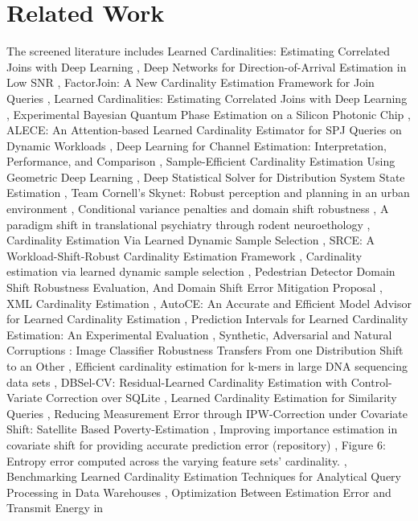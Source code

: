 \documentclass{article}
\begin{document}
\section{Related Work}
The screened literature includes Learned Cardinalities: Estimating Correlated Joins with Deep Learning \cite{kipf2018learned2cec5896}, Deep Networks for Direction-of-Arrival Estimation in Low SNR \cite{x2021deepbdec144a}, FactorJoin: A New Cardinality Estimation Framework for Join Queries \cite{wu2023factorjoin5aa7853d}, Learned Cardinalities: Estimating Correlated Joins with Deep Learning \cite{kipf2018learned40ff1c79}, Experimental Bayesian Quantum Phase Estimation on a Silicon Photonic Chip \cite{paesani2017experimental295f5d20}, ALECE: An Attention-based Learned Cardinality Estimator for SPJ Queries on Dynamic Workloads \cite{li2023aleceba644c8f}, Deep Learning for Channel Estimation: Interpretation, Performance, and Comparison \cite{hu2020deep755b619b}, Sample-Efficient Cardinality Estimation Using Geometric Deep Learning \cite{reiner2023sampleefficient49dfa849}, Deep Statistical Solver for Distribution System State Estimation \cite{habib2023deepcdb28edb}, Team Cornell's Skynet: Robust perception and planning in an urban environment \cite{miller2008team9a86bb6f}, Conditional variance penalties and domain shift robustness \cite{heinzedeml2020conditional74fbbfd5}, A paradigm shift in translational psychiatry through rodent neuroethology \cite{shemesh2023paradigm8187a38f}, Cardinality Estimation Via Learned Dynamic Sample Selection \cite{wang2023cardinality72317e05}, SRCE: A Workload-Shift-Robust Cardinality Estimation Framework \cite{xi2026srceaa213ccd}, Cardinality estimation via learned dynamic sample selection \cite{wang2023cardinality1f211b01}, Pedestrian Detector Domain Shift Robustness Evaluation, And Domain Shift Error Mitigation Proposal \cite{zemk2021pedestrianc29422ca}, XML Cardinality Estimation \cite{paperndxml8d9ded0c}, AutoCE: An Accurate and Efficient Model Advisor for Learned Cardinality Estimation \cite{zhang2023autoce4c0f494d}, Prediction Intervals for Learned Cardinality Estimation: An Experimental Evaluation \cite{thirumuruganathan2022predictionc2dd46a5}, Synthetic, Adversarial and Natural Corruptions : Image Classifier Robustness Transfers From one Distribution Shift to an Other \cite{laugrosndsynthetic5e1d7475}, Efficient cardinality estimation for k-mers in large DNA sequencing data sets \cite{irber2016efficientdf675cf8}, DBSel-CV: Residual-Learned Cardinality Estimation with Control-Variate Correction over SQLite \cite{zou2025dbselcv8793a99a}, Learned Cardinality Estimation for Similarity Queries \cite{sun2021learneda657857a}, Reducing Measurement Error through IPW-Correction under Covariate Shift: Satellite Based Poverty-Estimation \cite{arikan2026reducinge7ba99be}, Improving importance estimation in covariate shift for providing accurate prediction error (repository) \cite{fdezdaz2022improvingb6167025}, Figure 6: Entropy error computed across the varying feature sets’ cardinality. \cite{paperndfigure66fb7214}, Benchmarking Learned Cardinality Estimation Techniques for Analytical Query Processing in Data Warehouses \cite{hu2026benchmarkingbda28385}, Optimization Between Estimation Error and Transmit Energy in 
\end{document}
